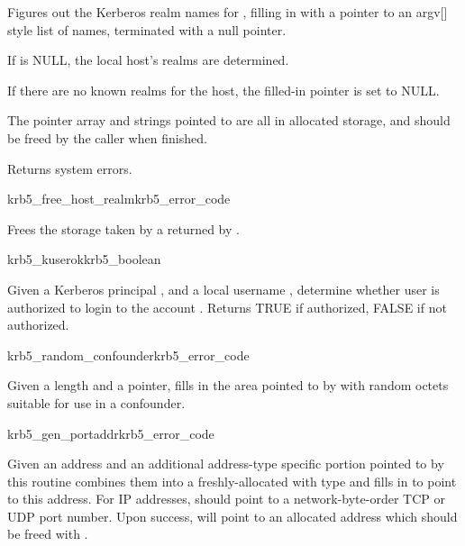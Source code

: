 Figures out the Kerberos realm names for , filling in
 with a
pointer to an argv[] style list of names, terminated with a null pointer.
 
If  is NULL, the local host's realms are determined.

If there are no known realms for the host, the filled-in pointer is set
to NULL.

The pointer array and strings pointed to are all in allocated storage,
and should be freed by the caller when finished.

Returns system errors.

\begin{funcdecl}{krb5_free_host_realm}{krb5_error_code}{\funcin}
\end{funcdecl}

Frees the storage taken by a  returned by
.

\begin{funcdecl}{krb5_kuserok}{krb5_boolean}{\funcin}
\end{funcdecl}

Given a Kerberos principal , and a local username
,
determine whether user is authorized to login to the account .
Returns TRUE if authorized, FALSE if not authorized.

\begin{funcdecl}{krb5_random_confounder}{krb5_error_code}{\funcin}
\funcout
{}
\end{funcdecl}

Given a length and a pointer, fills in the area pointed to by
 with  random octets suitable for use
in a confounder.

\begin{funcdecl}{krb5_gen_portaddr}{krb5_error_code}{\funcin}
\funcout
{}
\end{funcdecl}

Given an address  and an additional address-type specific
portion pointed to by
 this routine
combines them into a freshly-allocated
 with type  and fills in
 to point to this address.  For IP addresses,
 should point to a network-byte-order TCP or UDP port
number.  Upon success,  will point to an allocated
address which should be freed with .

